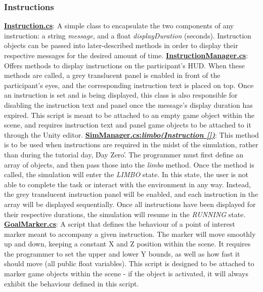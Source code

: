 \documentclass{article}
\begin{document}
\subsubsection*{Instructions} %
\href{https://bit.ly/2JFHEED}{\textbf{Instruction.cs}}: A simple class to encapsulate the two components of any instruction: a string \textit{message}, and a float \textit{displayDuration} (seconds). Instruction objects can be passed into later-described methods in order to display their respective messages for the desired amount of time. \newline \newline
\href{https://bit.ly/2TzLE9i}{\textbf{InstructionManager.cs}}: Offers methods to display instructions on the participant's HUD. When these methods are called, a grey translucent panel is enabled in front of the participant's eyes, and the corresponding instruction text is placed on top. Once an instruction is set and is being displayed, this class is also responsible for disabling the instruction text and panel once the message's display duration has expired. This script is meant to be attached to an empty game object within the scene, and requires instruction text and panel game objects to be attached to it through the Unity editor. \newline \newline
\href{https://bit.ly/2UhmSzq}{\textbf{SimManager.cs:\textit{limbo(Instruction [])}}}: This method is to be used when instructions are required in the midst of the simulation, rather than during the tutorial day, \'Day Zero\'. The programmer must first define an array of  objects, and then pass those into the \textit{limbo} method. Once the method is called, the simulation will enter the \textit{LIMBO} state. In this state, the user is not able to complete the task or interact with the environment in any way. Instead, the grey translucent instruction panel will be enabled, and each instruction in the array will be displayed sequentially. Once all instructions have been displayed for their respective durations, the simulation will resume in the \textit{RUNNING} state. \newline \newline
\href{https://bit.ly/2Yooc2m}{\textbf{GoalMarker.cs}}: A script that defines the behaviour of a point of interest marker meant to accompany a given instruction. The marker will move smoothly up and down, keeping a constant X and Z position within the scene. It requires the programmer to set the upper and lower Y bounds, as well as how fast it should move (all public float variables). This script is designed to be attached to marker game objects within the scene - if the object is activated, it will always exhibit the behaviour defined in this script. \newline \newline
\end{document}
